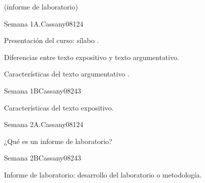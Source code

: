 \begin{syllabus}
\begin{goals}
(informe de laboratorio)
\end{goals}

\begin{outcomes}
\end{outcomes}

\begin{unit}{Semana 1A.}{Cassany08}{12}{4}
   \begin{topics}
      \item Presentación del curso: sílabo .
      \item Diferencias entre texto expositivo y texto argumentativo. 
      \item Características del texto argumentativo .
   \end{topics}
   \begin{unitgoals}
      \item 
   \end{unitgoals}
\end{unit}

\begin{unit}{Semana 1B}{Cassany08}{24}{3}
   \begin{topics}
      \item Características del texto expositivo.
   \end{topics}

   \begin{unitgoals}
      \item 
      \item
      \item 
      \end{unitgoals}
\end{unit}

\begin{unit}{Semana 2A.}{Cassany08}{12}{4}
   \begin{topics}
      \item ¿Qué es un informe de laboratorio? 
   \end{topics}
   \begin{unitgoals}
      \item 
   \end{unitgoals}
\end{unit}

\begin{unit}{Semana 2B}{Cassany08}{24}{3}
   \begin{topics}
      \item Informe de laboratorio: desarrollo del laboratorio o metodología.
   \end{topics}


\end{unit}
\end{syllabus}
